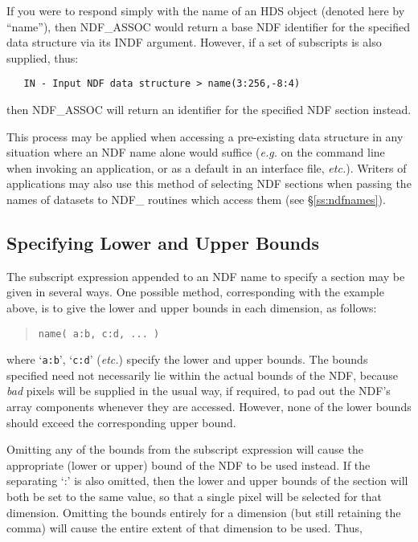 \documentclass[twoside,11pt]{article}
\newcommand{\htmlref}[2]{#1}
\newcommand{\xref}[3]{#1}
\newcommand{\xlabel}[1]{}
\newcommand{\st}[1]{{\em{#1}}}
\newcommand{\hi}[1]{{\tt{#1}}}
\begin{document}
If you were to respond simply with the name of an \xref{HDS}{sun92}{}
object (denoted here by ``name''), then \htmlref{NDF\_ASSOC}{NDF_ASSOC} would return a base
NDF identifier for the specified data structure via its INDF
argument. However, if a set of subscripts is also supplied, thus:

\small
\begin{verbatim}
   IN - Input NDF data structure > name(3:256,-8:4)
\end{verbatim}
\normalsize

then NDF\_ASSOC will return an identifier for the specified NDF section
instead.

This process may be applied when accessing a pre-existing data
structure in any situation where an NDF name alone would suffice
(\st{e.g.\/} on the command line when invoking an application, or as a
default in an interface file, \st{etc.}). Writers of applications may
also use this method of selecting NDF sections when passing the names
of datasets to NDF\_ routines which access them (see
\S\ref{ss:ndfnames}).

\subsection{\xlabel{specifying_lower_and_upper_bounds}Specifying Lower and Upper Bounds}

The subscript expression appended to an NDF name to specify a section
may be given in several ways. One possible method, corresponding with
the example above, is to give the lower and upper bounds in each
dimension, as follows:

\small
\begin{quote}
\begin{center}
\hi{name( a:b, c:d, ... )}
\end{center}
\end{quote}
\normalsize

where `\hi{a:b}', `\hi{c:d}' (\st{etc.}) specify the lower and upper bounds.
The bounds specified need not necessarily lie within the actual bounds of the
NDF, because \st{bad\/} pixels will be supplied in the usual way, if required,
to pad out the NDF's array components whenever they are accessed. However, none
of the lower bounds should exceed the corresponding upper bound.

Omitting any of the bounds from the subscript expression will cause the
appropriate (lower or upper) bound of the NDF to be used instead. If the
separating `:' is also omitted, then the lower and upper bounds of the section
will both be set to the same value, so that a single pixel will be selected for
that dimension. Omitting the bounds entirely for a dimension (but still
retaining the comma) will cause the entire extent of that dimension to be used.
Thus,
\end{document}
